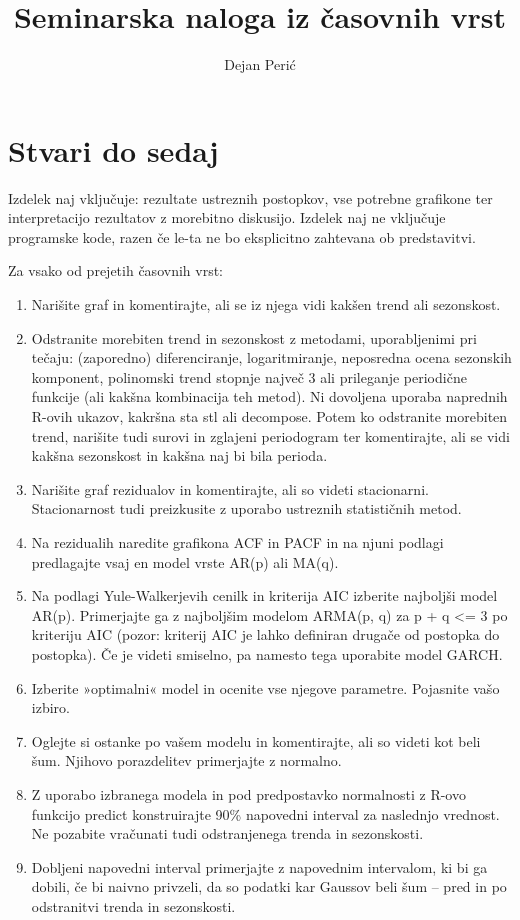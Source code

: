 \documentclass[a4paper]{article}
\title{Seminarska naloga iz časovnih vrst}
\author{Dejan Perić}
\begin{document}
\maketitle


\section{Stvari do sedaj}

Izdelek naj vključuje: rezultate ustreznih postopkov, vse potrebne grafikone ter interpretacijo rezultatov z morebitno diskusijo. Izdelek naj ne vključuje programske kode, razen če le-ta ne bo eksplicitno zahtevana ob predstavitvi.

Za vsako od prejetih časovnih vrst:
\begin{enumerate}
\item Narišite graf in komentirajte, ali se iz njega vidi kakšen trend ali sezonskost.
\item Odstranite morebiten trend in sezonskost z metodami, uporabljenimi pri tečaju: (zaporedno) diferenciranje, logaritmiranje, neposredna ocena sezonskih komponent, polinomski trend stopnje največ 3 ali prileganje periodične funkcije (ali kakšna kombinacija teh metod). Ni dovoljena uporaba naprednih R-ovih ukazov, kakršna sta stl ali decompose. Potem ko odstranite morebiten trend, narišite tudi surovi in zglajeni periodogram ter komentirajte, ali se vidi kakšna sezonskost in kakšna naj bi bila perioda.
\item Narišite graf rezidualov in komentirajte, ali so videti stacionarni. Stacionarnost tudi preizkusite z uporabo ustreznih statističnih metod.
\item Na rezidualih naredite grafikona ACF in PACF in na njuni podlagi predlagajte vsaj en model vrste AR(p) ali MA(q).
\item Na podlagi Yule-Walkerjevih cenilk in kriterija AIC izberite najboljši model AR(p). Primerjajte ga z najboljšim modelom ARMA(p, q) za p + q <= 3 po kriteriju AIC (pozor: kriterij AIC je lahko definiran drugače od postopka do postopka). Če je videti smiselno, pa namesto tega uporabite model GARCH.
\item Izberite »optimalni« model in ocenite vse njegove parametre. Pojasnite vašo izbiro.
\item Oglejte si ostanke po vašem modelu in komentirajte, ali so videti kot beli šum. Njihovo porazdelitev primerjajte z normalno.
\item Z uporabo izbranega modela in pod predpostavko normalnosti z R-ovo funkcijo predict konstruirajte 90\% napovedni interval za naslednjo vrednost. Ne pozabite vračunati tudi odstranjenega trenda in sezonskosti.
\item Dobljeni napovedni interval primerjajte z napovednim intervalom, ki bi ga dobili, če bi naivno privzeli, da so podatki kar Gaussov beli šum – pred in po odstranitvi trenda in sezonskosti.
\end{enumerate}
\end{document}

